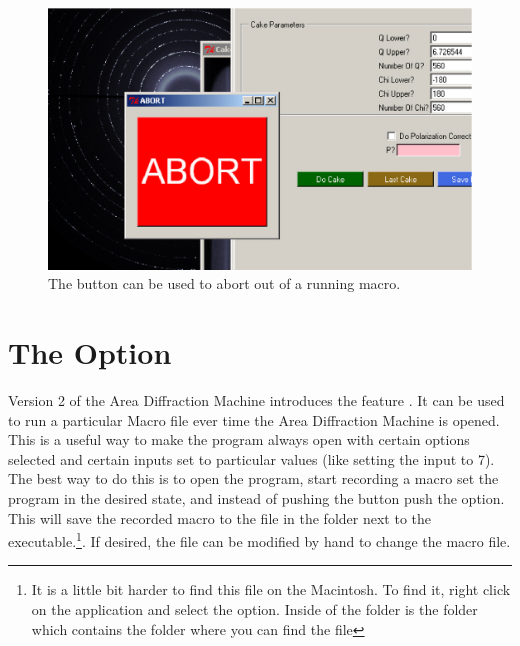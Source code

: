 \begin{figure}
    \centering
    \includegraphics[scale=.75]{figures/abort_button.eps}
    \caption{The  button can be used to abort
    out of a running macro.}
    \label{abort_button}
\end{figure}

\section{\texorpdfstring{The  Option}
    {The ``Set As Initialization'' Option}}

Version 2 of the Area Diffraction Machine introduces the
feature . It can be used to run
a particular Macro file ever time the Area Diffraction Machine
is opened. This is a useful way to make the program always open
with certain options selected and certain inputs set to particular
values (like setting the  input to 7).
The best way to do this is to open the program, start recording a macro
set the program in the desired state, and instead of pushing
the  button push the 
 option. This will save the recorded macro to
the file  in the folder
 next to the executable.\footnote{It
is a little bit harder to find this file on the Macintosh.
To find it, right click on the application and 
select the 
option. Inside of the  folder is the folder 
 which contains the  folder where
you can find the file}. If desired, the 
file can be modified by hand to change the macro file. 

